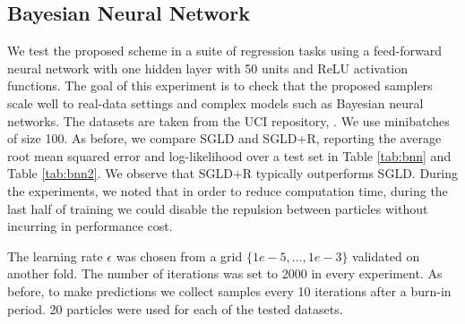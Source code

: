 \subsection{Bayesian Neural Network} 
We test the proposed scheme in a suite of regression tasks using a feed-forward neural network with one hidden layer with 50 units and ReLU activation functions. The goal of this experiment is to check that the proposed samplers scale well to real-data settings and complex models such as Bayesian neural networks. The datasets are taken from the UCI repository, \cite{Lichman:2013}. We use minibatches of size 100. %
As before, we compare SGLD and SGLD+R, reporting the average root mean squared error and log-likelihood over a test set in Table \ref{tab:bnn} and Table \ref{tab:bnn2}. We observe that SGLD+R typically outperforms SGLD. During the experiments, we noted that in order to reduce computation time, during the last half of training we could disable the repulsion between particles without incurring in performance cost.

The learning rate $\epsilon$ was chosen from a grid $\{1e-5, \ldots, 1e-3 \}$ validated on another fold. The number of iterations was set to 2000 in every experiment. As before, to make predictions we collect samples every 10 iterations after a burn-in period. 20 particles were used for each of the tested datasets.

\begin{table}[H]
\caption{Log-Likelihood results for the BNN experiments}\label{tab:bnn}
\end{table}

